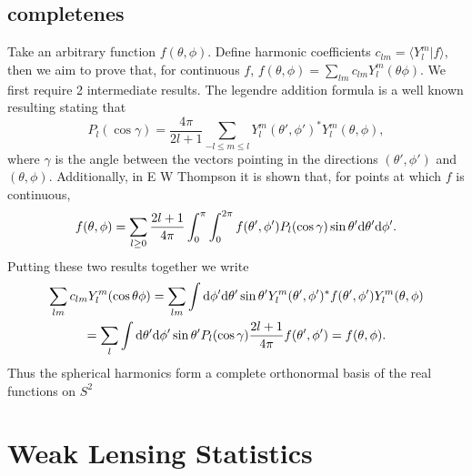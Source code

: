\documentclass[11pt]{article} %
\DeclareRobustCommand{\d}{\ifmmode\text{d}\else d\fi}
\begin{document}
\subsection{completenes}
Take an arbitrary function $f(\theta, \phi)$. Define harmonic coefficients $c_{lm} = \langle Y_l^m | f \rangle$, then we aim to prove that, for continuous $f$, $f(\theta, \phi) = \sum_{lm} c_{lm}Y^m_l(\theta\phi)$. We first require 2 intermediate results. The legendre addition formula is a well known resulting stating that
\begin{equation}
    P_l(\cos\gamma) = \frac{4\pi}{2l + 1} \sum_{-l\leq m \leq l} Y^m_l(\theta', \phi')^* Y^m_l(\theta, \phi),
\end{equation}
where $\gamma$ is the angle between the vectors pointing in the directions $(\theta', \phi')$ and $(\theta, \phi)$. Additionally, in E W Thompson %
it is shown that, for points at which $f$ is continuous,
\begin{equation}
   f(\theta, \phi) = \sum_{l\geq 0} \frac{2l + 1}{4\pi} \int^\pi_0\int^{2\pi}_{0}f(\theta',\phi')P_l(\cos\gamma)\sin\theta'\d\theta'\d\phi'.
\end{equation}
Putting these two results together we write 
\begin{gather}
    \sum_{lm} c_{lm}Y^m_l(\cos\theta\phi) = \sum_{lm} \int \d\phi'\d\theta'\sin\theta'Y^m_l(\theta',\phi')^*f(\theta',\phi')Y^m_l(\theta,\phi) \\
    = \sum_l \int \d\theta'\d\phi'\sin\theta' P_l(\cos\gamma)\frac{2l+1}{4\pi}f(\theta',\phi') = f(\theta, \phi).
\end{gather}
Thus the spherical harmonics form a complete orthonormal basis of the real functions on $S^2$

\section{Weak Lensing Statistics}
\end{document}
